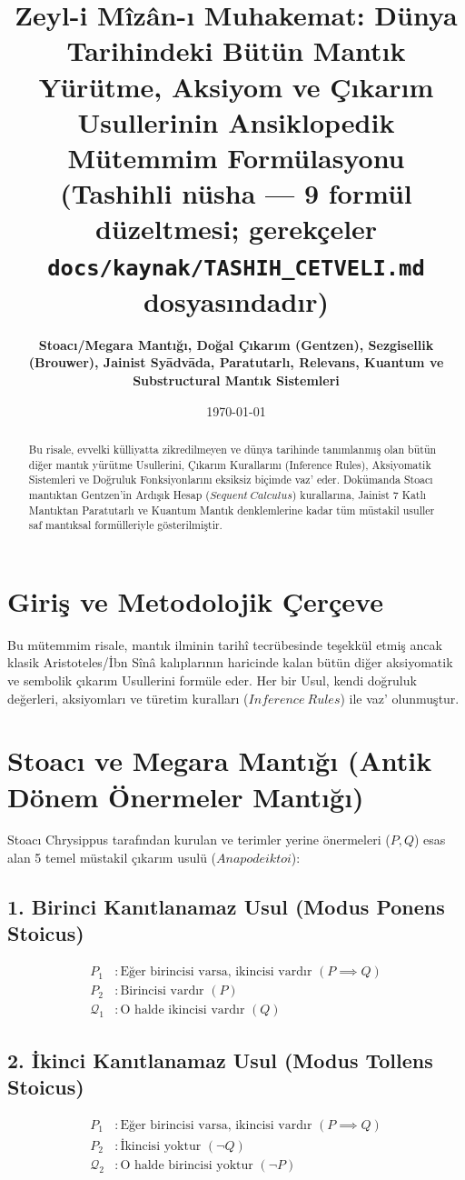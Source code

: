 \documentclass[11pt, a4paper]{article}
\title{\textbf{Zeyl-i Mîzân-ı Muhakemat: Dünya Tarihindeki Bütün Mantık Yürütme, Aksiyom ve Çıkarım Usullerinin Ansiklopedik Mütemmim Formülasyonu}\\ \normalsize\textmd{(Tashihli nüsha --- 9 formül düzeltmesi; gerekçeler \texttt{docs/kaynak/TASHIH\_CETVELI.md} dosyasındadır)}}
\author{\textbf{Stoacı/Megara Mantığı, Doğal Çıkarım (Gentzen), Sezgisellik (Brouwer), Jainist Syādvāda, Paratutarlı, Relevans, Kuantum ve Substructural Mantık Sistemleri}}
\date{\today}
\begin{document}
\maketitle

\begin{abstract}
Bu risale, evvelki külliyatta zikredilmeyen ve dünya tarihinde tanımlanmış olan bütün diğer mantık yürütme Usullerini, Çıkarım Kurallarını (Inference Rules), Aksiyomatik Sistemleri ve Doğruluk Fonksiyonlarını eksiksiz biçimde vaz' eder. Dokümanda Stoacı mantıktan Gentzen'in Ardışık Hesap ($Sequent\ Calculus$) kurallarına, Jainist 7 Katlı Mantıktan Paratutarlı ve Kuantum Mantık denklemlerine kadar tüm müstakil usuller saf mantıksal formülleriyle gösterilmiştir.
\end{abstract}

\tableofcontents
\newpage

\section{Giriş ve Metodolojik Çerçeve}

Bu mütemmim risale, mantık ilminin tarihî tecrübesinde teşekkül etmiş ancak klasik Aristoteles/İbn Sînâ kalıplarının haricinde kalan bütün diğer aksiyomatik ve sembolik çıkarım Usullerini formüle eder. Her bir Usul, kendi doğruluk değerleri, aksiyomları ve türetim kuralları ($Inference\ Rules$) ile vaz' olunmuştur.

\section{Stoacı ve Megara Mantığı (Antik Dönem Önermeler Mantığı)}

Stoacı Chrysippus tarafından kurulan ve terimler yerine önermeleri ($P, Q$) esas alan 5 temel müstakil çıkarım usulü ($Anapodeiktoi$):

\subsection{1. Birinci Kanıtlanamaz Usul (Modus Ponens Stoicus)}
\begin{align}
P_1 &: \text{Eğer birincisi varsa, ikincisi vardır } (P \implies Q) \\
P_2 &: \text{Birincisi vardır } (P) \\
\mathcal{Q}_{1} &: \text{O halde ikincisi vardır } (Q)
\end{align}

\subsection{2. İkinci Kanıtlanamaz Usul (Modus Tollens Stoicus)}
\begin{align}
P_1 &: \text{Eğer birincisi varsa, ikincisi vardır } (P \implies Q) \\
P_2 &: \text{İkincisi yoktur } (\neg Q) \\
\mathcal{Q}_{2} &: \text{O halde birincisi yoktur } (\neg P)
\end{align}
\end{document}
